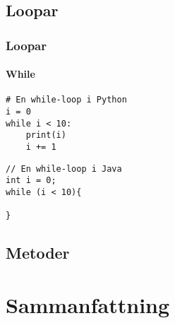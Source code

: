 \documentclass[aspectratio=169]{beamer}
\begin{document}
\subsection{Loopar}

\begin{frame}[fragile]
    \frametitle{Loopar}
    \framesubtitle{While}

    \begin{lstlisting}[style=python]
# En while-loop i Python
i = 0
while i < 10:
    print(i)
    i += 1
    \end{lstlisting}

    \begin{lstlisting}[style=java]
// En while-loop i Java
int i = 0;
while (i < 10){

}
    \end{lstlisting}


\end{frame}

\subsection{Metoder}

\subsection{}

\section{Sammanfattning}
\end{document}
